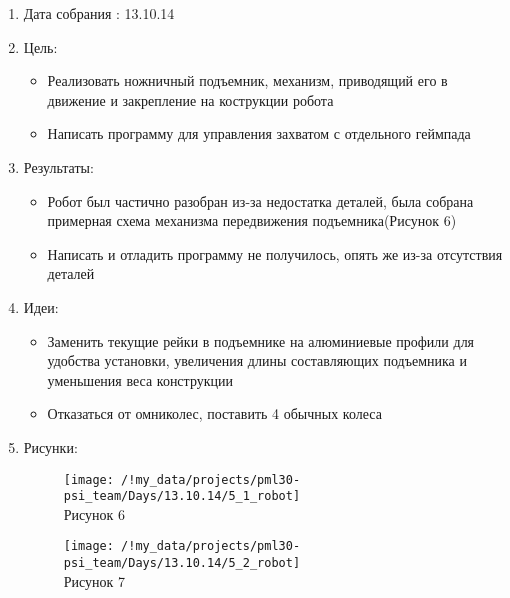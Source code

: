 
	\begin{enumerate}
		\item Дата собрания : 13.10.14
		\item Цель:
		\begin{itemize}
			\item Реализовать ножничный подъемник, механизм, приводящий его в движение и закрепление на кострукции робота
			\item Написать программу для управления захватом с отдельного геймпада
		\end{itemize}
		\item Результаты:
		\begin{itemize}
			\item Робот был частично разобран из-за недостатка деталей, была собрана примерная схема механизма передвижения подъемника(Рисунок 6)
			\item Написать и отладить программу не получилось, опять же из-за отсутствия деталей
		\end{itemize}
		\item Идеи:
		\begin{itemize}
			\item Заменить текущие рейки в подъемнике на алюминиевые профили для удобства установки, увеличения длины составляющих подъемника и уменьшения веса конструкции
			\item Отказаться от омниколес, поставить 4 обычных колеса
		\end{itemize}
		\item Рисунки:
		\begin{figure} [h]
			\centering
			\begin{minipage}{0.3\linewidth}
				\texttt{[image: /!my\_data/projects/pml30-psi\_team/Days/13.10.14/5\_1\_robot]}\\ Рисунок 6
			\end{minipage}
			\begin{minipage}{0.3\linewidth}
				\texttt{[image: /!my\_data/projects/pml30-psi\_team/Days/13.10.14/5\_2\_robot]}\\ Рисунок 7
			\end{minipage}
		\end{figure}
	\end{enumerate}
	\newpage
